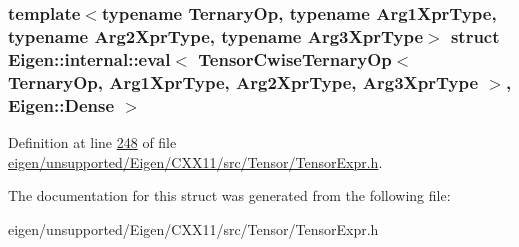 \subsubsection*{template$<$typename Ternary\+Op, typename Arg1\+Xpr\+Type, typename Arg2\+Xpr\+Type, typename Arg3\+Xpr\+Type$>$\newline
struct Eigen\+::internal\+::eval$<$ Tensor\+Cwise\+Ternary\+Op$<$ Ternary\+Op, Arg1\+Xpr\+Type, Arg2\+Xpr\+Type, Arg3\+Xpr\+Type $>$, Eigen\+::\+Dense $>$}



Definition at line \hyperlink{eigen_2unsupported_2_eigen_2_c_x_x11_2src_2_tensor_2_tensor_expr_8h_source_l00248}{248} of file \hyperlink{eigen_2unsupported_2_eigen_2_c_x_x11_2src_2_tensor_2_tensor_expr_8h_source}{eigen/unsupported/\+Eigen/\+C\+X\+X11/src/\+Tensor/\+Tensor\+Expr.\+h}.



The documentation for this struct was generated from the following file\+:\begin{DoxyCompactItemize}
\item 
eigen/unsupported/\+Eigen/\+C\+X\+X11/src/\+Tensor/\+Tensor\+Expr.\+h\end{DoxyCompactItemize}
